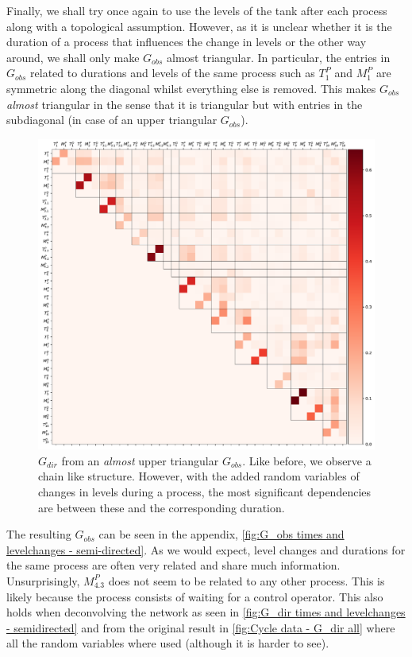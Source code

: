 \documentclass[../Thesis.tex]{subfiles}
\begin{document}
Finally, we shall try once again to use the levels of the tank after each process along with a topological assumption. However, as it is unclear whether it is the duration of a process that influences the change in levels or the other way around, we shall only make $G_{obs}$ almost triangular. In particular, the entries in $G_{obs}$ related to durations and levels of the same process such as $T^P_1$ and $M^P_1$ are symmetric along the diagonal whilst everything else is removed. This makes $G_{obs}$ \textit{almost} triangular in the sense that it is triangular but with entries in the subdiagonal (in case of an upper triangular $G_{obs}$). 
\begin{figure}[ht]
    \centering
    \includegraphics[width = \linewidth]{figures/Cycle data/G_dir times and levelchanges - semi-directed.pdf}
    \caption{$G_{dir}$ from an \textit{almost} upper triangular $G_{obs}$. Like before, we observe a chain like structure. However, with the added random variables of changes in levels during a process, the most significant dependencies are between these and the corresponding duration.}
    \label{fig:G_dir times and levelchanges - semidirected}
\end{figure}
The resulting $G_{obs}$ can be seen in the appendix, \autoref{fig:G_obs times and levelchanges - semi-directed}. As we would expect, level changes and durations for the same process are often very related and share much information. Unsurprisingly, $M^P_{4.3}$ does not seem to be related to any other process. This is likely because the process consists of waiting for a control operator. This also holds when deconvolving the network as seen in \autoref{fig:G_dir times and levelchanges - semidirected} and from the original result in \autoref{fig:Cycle data - G_dir all} where all the random variables where used (although it is harder to see). 
\end{document}
